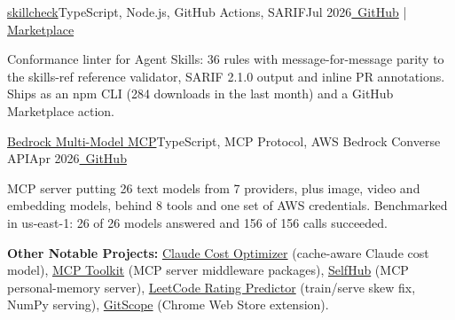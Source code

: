 \resumeExp
{\href{https://github.com/Sagargupta16/skillcheck}{skillcheck}}{TypeScript, Node.js, GitHub Actions, SARIF}{Jul 2026}{\href{https://github.com/Sagargupta16/skillcheck}{\faGithub\ GitHub} | \href{https://github.com/marketplace/actions/skillcheck-for-agent-skills}{Marketplace}}
\resumeItemListStart
    \item[$\diamond$] Conformance linter for Agent Skills: 36 rules with message-for-message parity to the skills-ref reference validator, SARIF 2.1.0 output and inline PR annotations. Ships as an npm CLI (284 downloads in the last month) and a GitHub Marketplace action.
\resumeItemListEnd

\resumeExp
{\href{https://github.com/Sagargupta16/bedrock-multi-model-mcp}{Bedrock Multi-Model MCP}}{TypeScript, MCP Protocol, AWS Bedrock Converse API}{Apr 2026}{\href{https://github.com/Sagargupta16/bedrock-multi-model-mcp}{\faGithub\ GitHub}}
\resumeItemListStart
    \item[$\diamond$] MCP server putting 26 text models from 7 providers, plus image, video and embedding models, behind 8 tools and one set of AWS credentials. Benchmarked in us-east-1: 26 of 26 models answered and 156 of 156 calls succeeded.
\resumeItemListEnd

\resumeSubHeadingListEnd
\vspace{-2pt}
\small{\textbf{Other Notable Projects:} \href{https://github.com/Sagargupta16/claude-cost-optimizer}{Claude Cost Optimizer} (cache-aware Claude cost model), \href{https://github.com/Sagargupta16/mcp-toolkit}{MCP Toolkit} (MCP server middleware packages), \href{https://github.com/Sagargupta16/SelfHub}{SelfHub} (MCP personal-memory server), \href{https://github.com/Sagargupta16/LeetCode_Rating_Predictor}{LeetCode Rating Predictor} (train/serve skew fix, NumPy serving), \href{https://chromewebstore.google.com/detail/gitscope/fndaanihifimmlnmkjdmjbbkbdajolff}{GitScope} (Chrome Web Store extension).}
\vspace{-2mm}
